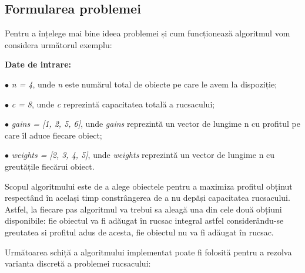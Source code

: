 \begin{sloppypar}
\subsection*{Formularea problemei}
Pentru a înțelege mai bine ideea problemei și cum funcționează algoritmul vom considera următorul exemplu:
\begin{textbox}
\textbf{Date de intrare:} \par
$\bullet$ \textit{n = 4}, unde \textit{n} este numărul total de obiecte pe care le avem la dispoziție; \par
$\bullet$ \textit{c = 8}, unde \textit{c} reprezintă capacitatea totală a rucsacului; \par
$\bullet$ \textit{gains = [1, 2, 5, 6]}, unde \textit{gains} reprezintă un vector de lungime n cu profitul pe care îl aduce fiecare obiect; \par
$\bullet$ \textit{weights = [2, 3, 4, 5]}, unde \textit{weights} reprezintă un vector de lungime n cu greutățile fiecărui obiect.
\end{textbox}

Scopul algoritmului este de a alege obiectele pentru a maximiza profitul obținut respectând în același timp constrângerea de a nu depăși capacitatea rucsacului. Astfel, la fiecare pas algoritmul va trebui sa aleagă una din cele două obțiuni disponibile: fie obiectul va fi adăugat în rucsac integral astfel considerându-se greutatea si profitul adus de acesta, fie obiectul nu va fi adăugat în rucsac. \par
Următoarea schiță a algoritmului implementat poate fi folosită pentru a rezolva varianta discretă a problemei rucsacului:


\end{sloppypar}
